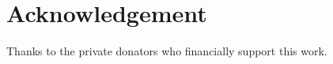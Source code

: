 \section*{Acknowledgement}
\label{s:acknowledgement}
Thanks to the private donators who financially support this work.
